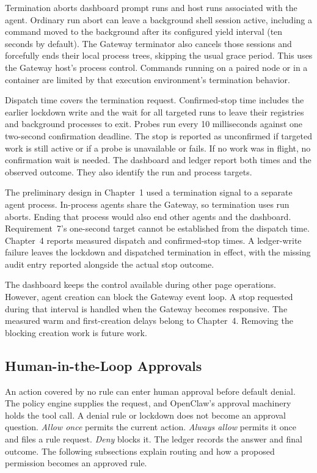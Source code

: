 {\color{red}Termination aborts dashboard prompt runs and host runs associated with the
agent. Ordinary run abort can leave a background shell session active, including
a command moved to the background after its configured yield interval
(ten seconds by default). The Gateway terminator also cancels those sessions
and forcefully ends their local process trees, skipping the usual
grace period. This uses the Gateway host's process control. Commands running
on a paired node or in a container are limited by that execution environment's
termination behavior.

Dispatch time covers the termination request. Confirmed-stop time includes
the earlier lockdown write and the wait for all targeted runs to leave their
registries and background processes to exit. Probes run every 10 milliseconds
against one two-second confirmation deadline. The stop is reported as unconfirmed
if targeted work is still active or if a probe is unavailable or fails.
If no work was in flight, no confirmation wait is needed. The dashboard and
ledger report both times and the observed outcome. They also identify the run
and process targets.

The preliminary design in Chapter~1 used a termination signal to a separate agent process. In-process agents share
the Gateway, so termination uses run aborts. Ending that process would also
end other agents and the dashboard. Requirement~7's one-second target cannot
be established from the dispatch time. Chapter~4 reports measured dispatch and
confirmed-stop times. A ledger-write failure leaves the lockdown and dispatched
termination in effect, with the missing audit entry reported alongside the
actual stop outcome.

The dashboard keeps the control available during other page operations. However,
agent creation can block the Gateway event loop. A stop requested during that
interval is handled when the Gateway becomes responsive. The measured warm and
first-creation delays belong to Chapter~4. Removing the blocking creation work
is future work.}

\FloatBarrier
\subsection{Human-in-the-Loop Approvals}
\label{sec:gov-approvals}

{\color{red}An action covered by no rule can enter human approval before default
denial. The policy engine supplies the request, and OpenClaw's approval
machinery holds the tool call. A denial rule or lockdown does not become an
approval question. \textit{Allow once} permits the current action.
\textit{Always allow} permits it once and files a rule request.
\textit{Deny} blocks it. The ledger records the answer and final outcome.
The following subsections explain routing and how a proposed permission
becomes an approved rule.}


